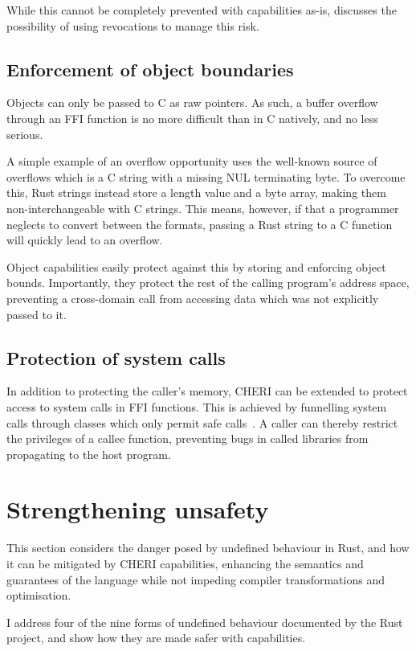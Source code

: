 \documentclass[dissertation.tex]{subfiles}
\begin{document}
While this cannot be completely prevented with capabilities as-is,
 discusses the possibility of using
revocations to manage this risk.

\subsection{Enforcement of object boundaries}
Objects can only be passed to C as raw pointers.
As such, a buffer overflow through an FFI function is no more difficult
than in C natively, and no less serious.

A simple example of an overflow opportunity uses the well-known source
of overflows which is a C string with a missing NUL terminating byte.
To overcome this, Rust strings instead store a length value and a byte
array, making them non-interchangeable with C strings.
This means, however, if that a programmer neglects to convert between
the formats, passing a Rust string to a C function will quickly lead to
an overflow.

Object capabilities easily protect against this by storing and enforcing
object bounds.
Importantly, they protect the rest of the calling program's address
space, preventing a cross-domain call from accessing data which was not
explicitly passed to it.

\subsection{Protection of system calls}
In addition to protecting the caller's memory, CHERI can be extended to
protect access to system calls in FFI functions.
This is achieved by funnelling system calls through classes which only
permit safe calls~\cite{cheri2015}.
A caller can thereby restrict the privileges of a callee function,
preventing bugs in called libraries from propagating to the host
program.


\section{Strengthening unsafety}
\label{sec:eval-betterunsafe}

This section considers the danger posed by undefined behaviour in Rust,
and how it can be mitigated by CHERI capabilities, enhancing the
semantics and guarantees of the language while not impeding compiler
transformations and optimisation.

I address four of the nine forms of undefined behaviour documented by
the Rust project, and show how they are made safer with capabilities.
\end{document}
